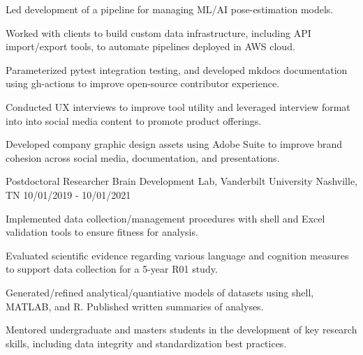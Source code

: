 \begin{cventries}
{\begin{cvitems}
{          Led development of a pipeline for managing ML/AI pose-estimation models.}
        \item {Worked with clients to build custom data infrastructure, including
          API import/export tools, to automate pipelines deployed in AWS cloud.}
        \item {Parameterized pytest integration testing, and developed mkdocs
          documentation using gh-actions to improve open-source contributor experience.}
        \item {Conducted UX interviews to improve tool utility and leveraged
          interview format into into social media content to promote product offerings.}
        \item {Developed company graphic design assets using Adobe Suite to
          improve brand cohesion across social media, documentation, and presentations.}
      \end{cvitems}
    }
\vspace{\baselineskip}
  \cventry
    {Postdoctoral Researcher}
    {Brain Development Lab, Vanderbilt University}
    {Nashville, TN}
    {10/01/2019 - 10/01/2021}
    {
      \begin{cvitems}
        \item{Implemented data collection/management procedures with shell and
          Excel validation tools to ensure fitness for analysis.}
        \item{Evaluated scientific evidence regarding various language and
          cognition measures to support data collection for a 5-year R01 study.}
        \item{Generated/refined analytical/quantiative models of datasets using
          shell, MATLAB, and R. Published written summaries of analyses.}
        \item{Mentored undergraduate and masters students in the development of
          key research skills, including data integrity and standardization best practices.}

\end{cvitems}}
\end{cventries}
